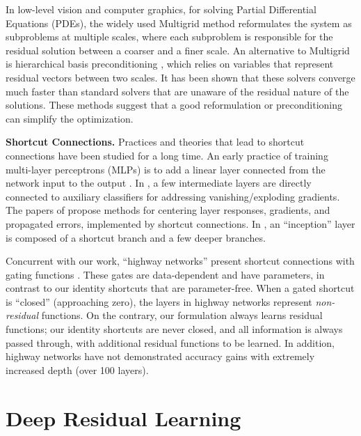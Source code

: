 In low-level vision and computer graphics, for solving Partial Differential Equations (PDEs), the widely used Multigrid method \cite{Briggs2000} reformulates the system as subproblems at multiple scales, where each subproblem is responsible for the residual solution between a coarser and a finer scale. An alternative to Multigrid is hierarchical basis preconditioning \cite{Szeliski1990,Szeliski2006}, which relies on variables that represent residual vectors between two scales. It has been shown \cite{Briggs2000,Szeliski1990,Szeliski2006} that these solvers converge much faster than standard solvers that are unaware of the residual nature of the solutions. These methods suggest that a good reformulation or preconditioning can simplify the optimization.

\vspace{6pt}
\noindent\textbf{Shortcut Connections.}
Practices and theories that lead to shortcut connections \cite{Bishop1995,Ripley1996,Venables1999} have been studied for a long time.
An early practice of training multi-layer perceptrons (MLPs) is to add a linear layer connected from the network input to the output \cite{Ripley1996,Venables1999}. In \cite{Szegedy2015,Lee2014}, a few intermediate layers are directly connected to auxiliary classifiers for addressing vanishing/exploding gradients. The papers of \cite{Schraudolph1998,Schraudolph1998a,Raiko2012,Vatanen2013} propose methods for centering layer responses, gradients, and propagated errors, implemented by shortcut connections. In \cite{Szegedy2015}, an ``inception'' layer is composed of a shortcut branch and a few deeper branches.


Concurrent with our work, ``highway networks'' \cite{Srivastava2015,Srivastava2015a} present shortcut connections with gating functions \cite{Hochreiter1997}. These gates are data-dependent and have parameters, in contrast to our identity shortcuts that are parameter-free. When a gated shortcut is ``closed'' (approaching zero), the layers in highway networks represent \emph{non-residual} functions. On the contrary, our formulation always learns residual functions; our identity shortcuts are never closed, and all information is always passed through, with additional residual functions to be learned. In addition, highway networks have not demonstrated accuracy gains with extremely increased depth (over 100 layers).

\section{Deep Residual Learning}

